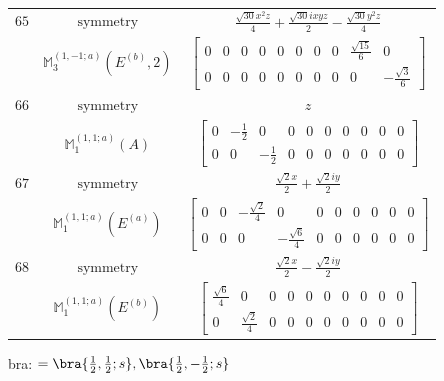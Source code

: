 \documentclass[fleqn,8pt,landscape]{jsarticle}
\begin{document}
\begin{longtable}{ccc}
$ 65 $ & $ \text{symmetry} $ & $ \frac{\sqrt{30} x^{2} z}{4} + \frac{\sqrt{30} i x y z}{2} - \frac{\sqrt{30} y^{2} z}{4} $ \\
$  $ & $ \mathbb{M}_{3}^{(1,-1;a)}(E^{(b)},2) $ & $ \begin{bmatrix} 0 & 0 & 0 & 0 & 0 & 0 & 0 & 0 & \frac{\sqrt{15}}{6} & 0 \\ 0 & 0 & 0 & 0 & 0 & 0 & 0 & 0 & 0 & - \frac{\sqrt{3}}{6} \end{bmatrix} $ \\ \hline
$ 66 $ & $ \text{symmetry} $ & $ z $ \\
$  $ & $ \mathbb{M}_{1}^{(1,1;a)}(A) $ & $ \begin{bmatrix} 0 & - \frac{1}{2} & 0 & 0 & 0 & 0 & 0 & 0 & 0 & 0 \\ 0 & 0 & - \frac{1}{2} & 0 & 0 & 0 & 0 & 0 & 0 & 0 \end{bmatrix} $ \\ \hline
$ 67 $ & $ \text{symmetry} $ & $ \frac{\sqrt{2} x}{2} + \frac{\sqrt{2} i y}{2} $ \\
$  $ & $ \mathbb{M}_{1}^{(1,1;a)}(E^{(a)}) $ & $ \begin{bmatrix} 0 & 0 & - \frac{\sqrt{2}}{4} & 0 & 0 & 0 & 0 & 0 & 0 & 0 \\ 0 & 0 & 0 & - \frac{\sqrt{6}}{4} & 0 & 0 & 0 & 0 & 0 & 0 \end{bmatrix} $ \\ \hline
$ 68 $ & $ \text{symmetry} $ & $ \frac{\sqrt{2} x}{2} - \frac{\sqrt{2} i y}{2} $ \\
$  $ & $ \mathbb{M}_{1}^{(1,1;a)}(E^{(b)}) $ & $ \begin{bmatrix} \frac{\sqrt{6}}{4} & 0 & 0 & 0 & 0 & 0 & 0 & 0 & 0 & 0 \\ 0 & \frac{\sqrt{2}}{4} & 0 & 0 & 0 & 0 & 0 & 0 & 0 & 0 \end{bmatrix} $ \\ \hline
\end{longtable}
bra: $=\bra{\frac{1}{2},\frac{1}{2};s}, \bra{\frac{1}{2},- \frac{1}{2};s}$
\end{document}
